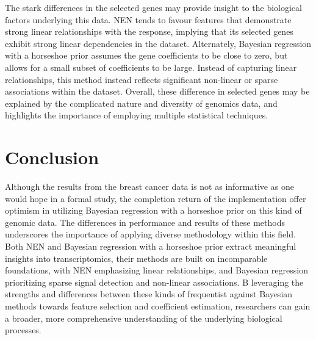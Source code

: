 \documentclass[
	a4paper, %
	10pt, %
	unnumberedsections, %
	twoside, %
]{LTJournalArticle}
\newcommand{\1}{\mathbbm{1}}
\begin{document}
The stark differences in the selected genes may provide insight to the biological factors underlying this data. NEN tends to favour features that demonstrate strong linear relationships with the response, implying that its selected genes exhibit strong linear dependencies in the dataset. Alternately, Bayesian regression with a horseshoe prior assumes the gene coefficients to be close to zero, but allows for a small subset of coefficients to be large. Instead of capturing linear relationships, this method instead reflects significant non-linear or sparse associations within the dataset. Overall, these difference in selected genes may be explained by the complicated nature and diversity of genomics data, and highlights the importance of employing multiple statistical techniques. 

\section{Conclusion}

Although the results from the breast cancer data is not as informative as one would hope in a formal study, the completion return of the implementation offer optimism in utilizing Bayesian regression with a horseshoe prior on this kind of genomic data. The differences in performance and results of these methods underscores the importance of applying diverse methodology within this field. Both NEN and Bayesian regression with a horseshoe prior extract meaningful insights into transcriptomics, their methods are built on incomparable foundations, with NEN emphasizing linear relationships, and Bayesian regression prioritizing sparse signal detection and non-linear associations. B leveraging the strengths and differences between these kinds of frequentist against Bayesian methods towards feature selection and coefficient estimation, researchers can gain a broader, more comprehensive understanding of the underlying biological processes.
\end{document}
